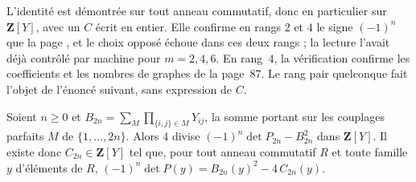 \begin{remarque}
L'identité est démontrée sur tout anneau commutatif, donc en particulier sur $\mathbf Z[Y]$, avec un $C$ écrit en entier. Elle confirme en rangs $2$ et $4$ le signe $(-1)^n$ que la page , et le choix opposé échoue dans ces deux rangs ; la lecture l'avait déjà contrôlé par machine pour $m = 2, 4, 6$. En rang~$4$, la vérification confirme les coefficients et les nombres de graphes de la page~87. Le rang pair quelconque fait l'objet de l'énoncé suivant, sans expression de $C$.
\end{remarque}

\begin{encadre}
\begin{theoreme}
Soient $n \geq 0$ et $B_{2n} = \sum_{M} \prod_{\{i, j\} \in M} Y_{ij}$, la somme portant sur les couplages parfaits $M$ de $\{1, \dots, 2n\}$. Alors $4$ divise $(-1)^n \det P_{2n} - B_{2n}^2$ dans $\mathbf Z[Y]$. Il existe donc $C_{2n} \in \mathbf Z[Y]$ tel que, pour tout anneau commutatif $R$ et toute famille $y$ d'éléments de $R$, $(-1)^n \det P(y) = B_{2n}(y)^2 - 4\,C_{2n}(y)$.
\end{theoreme}
\end{encadre}

